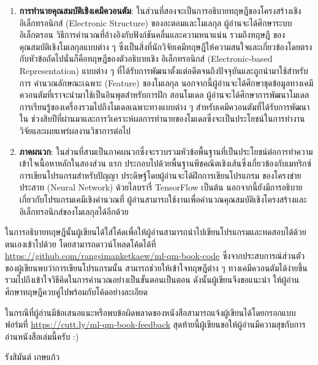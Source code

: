 {\begin{enumerate}[topsep=0pt]
    \item \textbf{การทำนายคุณสมบัติเชิงเคมีควอนตัม}: ในส่วนที่สองจะเป็นการอธิบายทฤษฎีของโครงสร้างเชิงอิเล็กทรอนิกส์ (Electronic 
    Structure) ของอะตอมและโมเลกุล ผู้อ่านจะได้ศึกษาระบบอิเล็กตรอน วิธีการคำนวณที่อ้างอิงกับฟังก์ชันคลื่นและความหนาแน่น รวมถึงทฤษฎี%
    ของคุณสมบัติเชิงโมเลกุลแบบต่าง ๆ ซึ่งเป็นสิ่งที่นักวิจัยเคมีทฤษฎีให้ความสนใจและเกี่ยวข้องโดยตรงกับหัวข้อถัดไปนั่นก็คือทฤษฎีของตัวอธิบายเชิง%
    อิเล็กทรอนิกส์ (Electronic-based Representation) แบบต่าง ๆ ที่ได้รับการพัฒนาตั้งแต่อดีตจนถึงปัจจุบันและถูกนำมาใช้สำหรับการ%
    คำนวณลักษณะเฉพาะ (Feature) ของโมเลกุล นอกจากนี้ผู้อ่านจะได้ศึกษาชุดข้อมูลทางเคมีควอนตัมที่เราจะนำมาใช้เป็นอินพุตสำหรับการฝึก%
    สอนโมเดล ผู้อ่านจะได้ศึกษาการพัฒนาโมเดลการเรียนรู้ของเครื่องรวมไปถึงโมเดลเฉพาะทางแบบต่าง ๆ สำหรับเคมีควอนตัมที่ได้รับการพัฒนาใน%
    ช่วงสิบปีที่ผ่านมาและการวิเคราะห์ผลการทำนายของโมเดลซึ่งจะเป็นประโยชน์ในการทำงานวิจัยและเผยแพร่ผลงานวิชาการต่อไป

    \item \textbf{ภาคผนวก}: ในส่วนที่สามเป็นภาคผนวกซึ่งจะรวบรวมหัวข้อพื้นฐานที่เป็นประโยชน์ต่อการทำความเข้าใจเนื้อหาหลักในสองส่วน%
    แรก ประกอบไปด้วยพื้นฐานพีชคณิตเชิงเส้นซึ่งเกี่ยวข้องกับเมทริกซ์ การเขียนโปรแกรมสำหรับปัญญา ประดิษฐ์โดยผู้อ่านจะได้ฝึกการเขียนโปรแกรม%
    ของโครงข่ายประสาท (Neural Network) ด้วยไลบรารี่ TensorFlow เป็นต้น นอกจากนี้ยังมีการอธิบายเกี่ยวกับโปรแกรมเคมีเชิงคำนวณที่%
    ผู้อ่านสามารถใช้งานเพื่อคำนวณคุณสมบัติเชิงโครงสร้างและอิเล็กทรอนิกส์ของโมเลกุลได้อีกด้วย
\end{enumerate}

ในการอธิบายทฤษฎีนั้นผู้เขียนได้ใส่โค้ดเพื่อให้ผู้อ่านสามารถนำไปเขียนโปรแกรมและทดสอบได้ด้วยตนเองเข้าไปด้วย โดยสามารถดาวน์โหลดโค้ดได้ที่ 
\url{https://github.com/rangsimanketkaew/ml-qm-book-code} ซึ่งจากประสบการณ์ส่วนตัวของผู้เขียนพบว่าการเขียนโปรแกรมนั้น%
สามารถช่วยให้เข้าใจทฤษฎีต่าง ๆ ทางเคมีควอนตัมได้ง่ายขึ้น รวมไปถึงเข้าใจวิธีคิดในการคำนวณอย่างเป็นขั้นตอนเป็นตอน ดังนั้นผู้เขียนจึงขอแนะนำ%
ให้ผู้อ่านศึกษาทฤษฎีควบคู่ไปพร้อมกับโค้ดอย่างละเอียด

ในกรณีที่ผู้อ่านมีข้อเสนอแนะหรือพบข้อผิดพลาดของหนังสือสามารถแจ้งผู้เขียนได้โดยกรอกแบบฟอร์มที่ 
\url{https://cutt.ly/ml-qm-book-feedback} สุดท้ายนี้ผู้เขียนขอให้ผู้อ่านมีความสุขกับการอ่านหนังสือเล่มนี้ครับ :)

\medskip

\begin{flushright}
รังสิมันต์ เกษแก้ว
\end{flushright}
}
